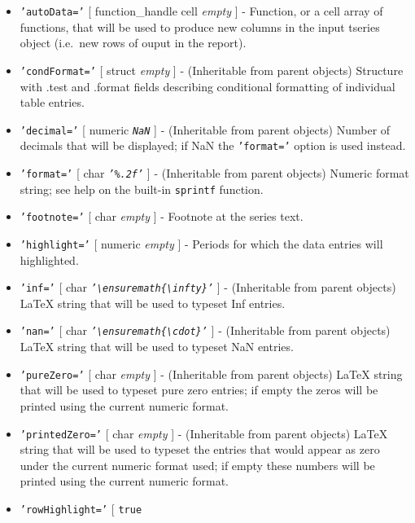 \begin{itemize}
\item
  \texttt{'autoData='} {[} function\_handle \textbar{} cell \textbar{}
  \emph{empty} {]} - Function, or a cell array of functions, that will
  be used to produce new columns in the input tseries object (i.e.~new
  rows of ouput in the report).
\item
  \texttt{'condFormat='} {[} struct \textbar{} \emph{empty} {]} -
  (Inheritable from parent objects) Structure with .test and .format
  fields describing conditional formatting of individual table entries.
\item
  \texttt{'decimal='} {[} numeric \textbar{} \emph{\texttt{NaN}} {]} -
  (Inheritable from parent objects) Number of decimals that will be
  displayed; if NaN the \texttt{'format='} option is used instead.
\item
  \texttt{'format='} {[} char \textbar{} \emph{\texttt{'\%.2f'}} {]} -
  (Inheritable from parent objects) Numeric format string; see help on
  the built-in \texttt{sprintf} function.
\item
  \texttt{'footnote='} {[} char \textbar{} \emph{empty} {]} - Footnote
  at the series text.
\item
  \texttt{'highlight='} {[} numeric \textbar{} \emph{empty} {]} -
  Periods for which the data entries will highlighted.
\item
  \texttt{'inf='} {[} char \textbar{}
  \emph{\texttt{'\textbackslash{}ensuremath\{\textbackslash{}infty\}'}}
  {]} - (Inheritable from parent objects) LaTeX string that will be used
  to typeset Inf entries.
\item
  \texttt{'nan='} {[} char \textbar{}
  \emph{\texttt{'\textbackslash{}ensuremath\{\textbackslash{}cdot\}'}}
  {]} - (Inheritable from parent objects) LaTeX string that will be used
  to typeset NaN entries.
\item
  \texttt{'pureZero='} {[} char \textbar{} \emph{empty} {]} -
  (Inheritable from parent objects) LaTeX string that will be used to
  typeset pure zero entries; if empty the zeros will be printed using
  the current numeric format.
\item
  \texttt{'printedZero='} {[} char \textbar{} \emph{empty} {]} -
  (Inheritable from parent objects) LaTeX string that will be used to
  typeset the entries that would appear as zero under the current
  numeric format used; if empty these numbers will be printed using the
  current numeric format.
\item
  \texttt{'rowHighlight='} {[} \texttt{true} \textbar{}

\end{itemize}
